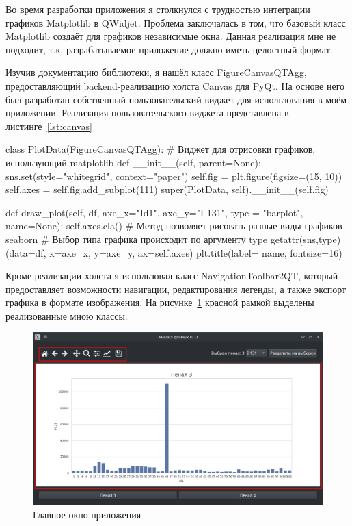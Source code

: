 Во время разработки приложения я столкнулся с трудностью интеграции графиков Matplotlib в QWidjet. Проблема заключалась в том, что базовый класс Matplotlib создаёт для графиков независимые окна. Данная реализация мне не подходит, т.к. разрабатываемое приложение должно иметь целостный формат.

Изучив документацию библиотеки, я нашёл класс FigureCanvasQTAgg, предоставляющий backend-реализацию холста Canvas для PyQt. На основе него был разработан собственный пользовательский виджет для использования в моём приложении. Реализация пользовательского виджета представлена в листинге~\ref{lst:canvas}

\begin{flushleft}
 \label{lst:canvas}
\begin{MyCodes}
class PlotData(FigureCanvasQTAgg): 
	# Виджет для отрисовки графиков, использующий matplotlib
	def __init__(self, parent=None):
		sns.set(style="whitegrid", context="paper")
		self.fig = plt.figure(figsize=(15, 10))
		self.axes = self.fig.add_subplot(111)
		super(PlotData, self).__init__(self.fig)
	
	def draw_plot(self, df, axe_x="Id1",
			axe_y="I-131", type = "barplot", name=None):
		self.axes.cla()
		# Метод позволяет рисовать разные виды графиков seaborn
		# Выбор типа графика происходит по аргументу type
		getattr(sns,type)(data=df, x=axe_x, y=axe_y, ax=self.axes)
		plt.title(label= name, fontsize=16)
\end{MyCodes}
\end{flushleft}

Кроме реализации холста я использовал класс NavigationToolbar2QT, который предоставляет возможности навигации, редактирования легенды, а также экспорт графика в формате изображения. На рисунке~\ref{fig:ris8} красной рамкой выделены реализованные мною классы.

\begin{figure}[H]
	\centering
	\includegraphics[width=1\linewidth]{pics/ris8} %
	\caption{Главное окно приложения}
	\label{fig:ris8} %
\end{figure}

